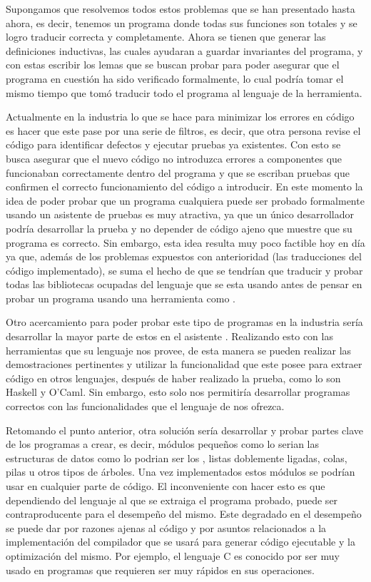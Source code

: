 Supongamos que resolvemos todos estos problemas que se han presentado hasta ahora, es decir,
tenemos un programa donde todas sus funciones son totales y se logro traducir correcta y
completamente. Ahora se tienen que generar las definiciones inductivas, las 
cuales ayudaran a
guardar invariantes del programa, y con estas escribir los lemas que se buscan 
probar para poder
asegurar que el programa en cuesti\'on ha sido verificado formalmente, lo cual 
podría tomar el mismo tiempo que tom\'o
traducir todo el programa al lenguaje de la herramienta.

Actualmente en la industria lo que se hace para minimizar los errores en 
c\'odigo es hacer que este
pase por una serie de filtros, es decir, que otra persona revise el c\'odigo 
para identificar defectos y ejecutar pruebas ya existentes. Con esto se busca 
asegurar que el nuevo c\'odigo no
introduzca errores a componentes que funcionaban correctamente dentro del programa y que se escriban 
pruebas que confirmen el correcto funcionamiento del c\'odigo a introducir. En este momento la idea 
de poder probar que un programa cualquiera puede ser probado formalmente usando un asistente de 
pruebas es muy atractiva, ya que un \'unico desarrollador podr\'ia desarrollar la prueba y no 
depender de código ajeno que muestre que su programa es correcto. Sin embargo, esta idea resulta muy 
poco factible hoy en día ya que, además de los problemas expuestos con anterioridad (las 
traducciones del c\'odigo implementado), se suma el hecho de que se tendrían que traducir y probar 
todas las bibliotecas ocupadas del lenguaje que se esta usando antes de pensar en probar un 
programa usando una herramienta como {\coq}.

Otro acercamiento para poder probar este tipo de programas en la industria ser\'ia desarrollar la 
mayor parte de estos en el asistente {\coq}. Realizando esto con las herramientas que su lenguaje 
nos provee, de esta manera se pueden realizar las demostraciones pertinentes y utilizar la 
funcionalidad que este posee para extraer c\'odigo en otros lenguajes, después de haber realizado la 
prueba, como lo son Haskell y O'Caml. Sin embargo, esto solo nos permitiría desarrollar programas 
correctos con las funcionalidades que el lenguaje de {\coq} nos ofrezca.

Retomando el punto anterior, otra soluci\'on ser\'ia desarrollar y probar 
partes clave de los 
programas a crear, es decir, m\'odulos pequeños como lo serian las estructuras de datos como 
lo podrian ser los {\arns}, listas doblemente ligadas, colas, pilas u otros tipos de \'arboles. Una 
vez implementados estos m\'odulos se podrían usar en cualquier parte de 
c\'odigo. El inconveniente con 
hacer esto es que dependiendo del lenguaje al que se extraiga el programa probado, puede ser 
contraproducente para el desempeño del mismo. Este degradado en el desempeño se puede dar por 
razones ajenas al c\'odigo y por asuntos relacionados a la implementaci\'on del compilador que 
se usar\'a para generar c\'odigo ejecutable y la optimizaci\'on del mismo. Por ejemplo, el 
lenguaje C es conocido por ser muy usado en programas que requieren ser muy rápidos en sus 
operaciones.

